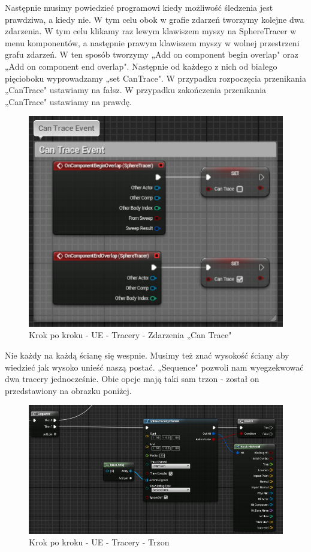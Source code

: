 \documentclass[12pt]{xmgr}
\begin{document}
\newpage
Następnie musimy powiedzieć programowi kiedy możliwość śledzenia jest prawdziwa, a kiedy nie. W tym celu obok w grafie zdarzeń tworzymy kolejne dwa zdarzenia. W tym celu klikamy raz lewym klawiszem myszy na SphereTracer w menu komponentów, a następnie prawym klawiszem myszy w wolnej przestrzeni grafu zdarzeń. W ten sposób tworzymy „Add on component begin overlap" oraz „Add on component end overlap". Następnie od każdego z nich od białego pięcioboku wyprowadzamy „set CanTrace". W przypadku rozpoczęcia przenikania „CanTrace" ustawiamy na fałsz. W przypadku zakończenia przenikania „CanTrace" ustawiamy na prawdę.

\begin{figure}[!htb]
    \begin{center}
    \includegraphics[scale=0.5]{Screeny/UeKrokPoKroku/UE-canTrace}
    \end{center}
    \caption{Krok po kroku - UE - Tracery - Zdarzenia „Can Trace"}
\end{figure}

Nie każdy na każdą ścianę się wespnie. Musimy też znać wysokość ściany aby wiedzieć jak wysoko unieść naszą postać. „Sequence" pozwoli nam wyegzekwować dwa tracery jednocześnie. Obie opcje mają taki sam trzon - został on przedstawiony na obrazku poniżej.

\begin{figure}[!htb]
    \begin{center}
    \includegraphics[scale=0.5]{Screeny/UeKrokPoKroku/UE-Tracer}
    \end{center}
    \caption{Krok po kroku - UE - Tracery - Trzon}
\end{figure}
\end{document}
